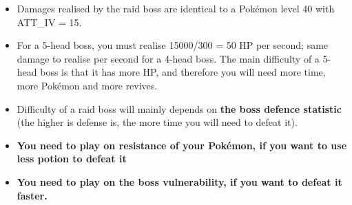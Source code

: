 \documentclass[8pt,aspectratio=169,compress]{beamer}
\begin{document}
\begin{frame}
\begin{block}{}
\begin{tiny}
\begin{itemize}
   \item Damages realised by the raid boss are identical to a Pok\'emon level 40 with ATT\_IV = 15.
  \item For a 5-head boss, you must realise 15000/300 = 50 HP per second; same damage to realise per second for a 4-head boss. The main difficulty of a 5-head boss is that it has more HP, and therefore you will need more time, more Pok\'emon and more revives.
  \item Difficulty of a raid boss will mainly depends on \textbf{the boss defence statistic} (the higher is defense is, the more time you will need to defeat it).
  \item \textbf{You need to play on resistance of your Pok\'emon, if you want to use less potion to defeat it}
  \item \textbf{You need to play on the boss vulnerability, if you want to defeat it faster.}
\end{itemize}

\end{tiny}
\end{block}
\end{frame}
\end{document}
